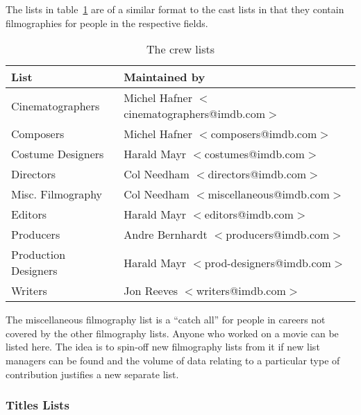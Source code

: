 The lists in table~\ref{tbl:crew} are of a similar format to the cast 
lists in 
that they contain filmographies for people in the respective fields.
\begin{table}
\begin{center}
{\small
\begin{tabular}{|l|l|} \hline
List  & Maintained by  \\ \hline
Cinematographers & Michel Hafner $<$cinematographers@imdb.com$>$ \\ \hline
Composers        & Michel Hafner $<$composers@imdb.com$>$ \\ \hline
Costume Designers & Harald Mayr $<$costumes@imdb.com$>$ \\ \hline
Directors        & Col Needham $<$directors@imdb.com$>$ \\ \hline
Misc. Filmography & Col Needham $<$miscellaneous@imdb.com$>$ \\ \hline
Editors          & Harald Mayr $<$editors@imdb.com$>$ \\ \hline
Producers        & Andre Bernhardt $<$producers@imdb.com$>$ \\ \hline
Production Designers & Harald Mayr $<$prod-designers@imdb.com$>$ \\ \hline
Writers          & Jon Reeves $<$writers@imdb.com$>$ \\ \hline
\end{tabular}}
\caption{\label{tbl:crew} The crew lists}
\end{center}
\end{table}

The miscellaneous filmography list is a ``catch all'' for people in 
careers not
covered by the other filmography lists. Anyone who worked on a movie can 
be 
listed here. The idea is to spin-off new filmography lists from it if new
list managers can be found and the volume of data relating to a particular
type of contribution justifies a new separate list.

\subsubsection{Titles Lists}

